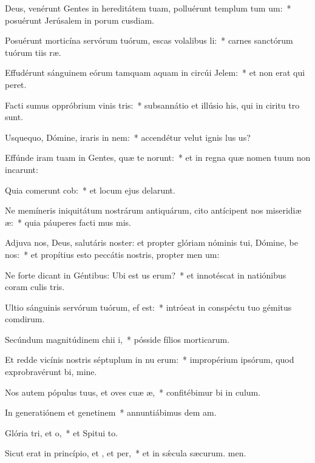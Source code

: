 \item Deus, venérunt Gentes in hereditátem tuam, polluérunt templum tum um:~* posuérunt Jerúsalem in porum cusdiam.
\item Posuérunt morticína servórum tuórum, escas volalibus li:~* carnes sanctórum tuórum tiis ræ.
\item Effudérunt sánguinem eórum tamquam aquam in circúi Jelem:~* et non erat qui peret.
\item Facti sumus oppróbrium vinis tris:~* subsannátio et illúsio his, qui in ciritu tro sunt.
\item Usquequo, Dómine, iraris in nem:~* accendétur velut ignis lus us?
\item Effúnde iram tuam in Gentes, quæ te  norunt:~* et in regna quæ nomen tuum non incarunt:
\item Quia comerunt cob:~* et locum ejus delarunt.
\item Ne memíneris iniquitátum nostrárum antiquárum, cito antícipent nos miseridiæ æ:~* quia páuperes facti mus mis.
\item Adjuva nos, Deus, salutáris noster: et propter glóriam nóminis tui, Dómine, be nos:~* et propítius esto peccátis nostris, propter men um:
\item Ne forte dicant in Géntibus: Ubi est us erum?~* et innotéscat in natiónibus coram culis tris.
\item Ultio sánguinis servórum tuórum,  ef est:~* intróeat in conspéctu tuo gémitus comdirum.
\item Secúndum magnitúdinem chii i,~* pósside fílios morticarum.
\item Et redde vicínis nostris séptuplum in nu erum:~* impropérium ipsórum, quod exprobravérunt bi, mine.
\item Nos autem pópulus tuus, et oves cuæ æ,~* confitébimur bi in culum.
\item In generatiónem et genetinem~* annuntiábimus dem am.
\item Glória tri, et o,~* et Spitui to.
\item Sicut erat in princípio, et , et per,~* et in sǽcula sæcurum. men.
